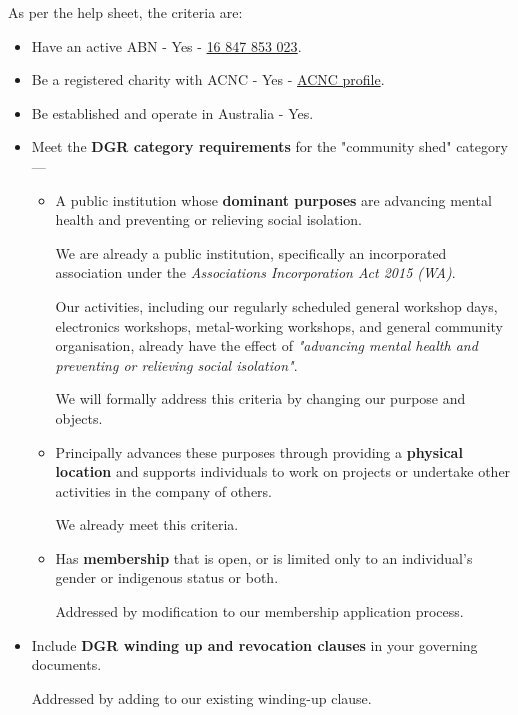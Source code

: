 \documentclass[../constitution.tex]{subfiles}
\begin{document}
\bigskip

As per the help sheet, the criteria are:

\begin{itemize}
    \item Have an active ABN - Yes - \href{https://abr.business.gov.au/ABN/View/16847853023}{16 847 853 023}.
    \item Be a registered charity with ACNC - Yes - \href{https://www.acnc.gov.au/charity/charities/705391a6-3aaf-e811-a963-000d3ad24077/profile}{ACNC profile}.
    \item Be established and operate in Australia - Yes.
    \item Meet the \textbf{DGR category requirements} for the "community shed" category ---
    \begin{itemize}
        \item A public institution whose \textbf{dominant purposes} are advancing mental health and preventing or relieving social isolation.
        
        We are already a public institution, specifically an incorporated association under the \textit{Associations Incorporation Act 2015 (WA)}.
        
        Our activities, including our regularly scheduled general workshop days, electronics workshops, metal-working workshops, and general community organisation, already have the effect of \textit{"advancing mental health and preventing or relieving social isolation"}.
        
        We will formally address this criteria by changing our purpose and objects.
        \item Principally advances these purposes through providing a \textbf{physical location} and supports individuals to work on projects or undertake other activities in the company of others.
        
        We already meet this criteria.
        \item Has \textbf{membership} that is open, or is limited only to an individual's gender or indigenous status or both.
        
        Addressed by modification to our membership application process.
    \end{itemize}
    \item Include \textbf{DGR winding up and revocation clauses} in your governing documents.
    
    Addressed by adding to our existing winding-up clause.
\end{itemize}
\end{document}
